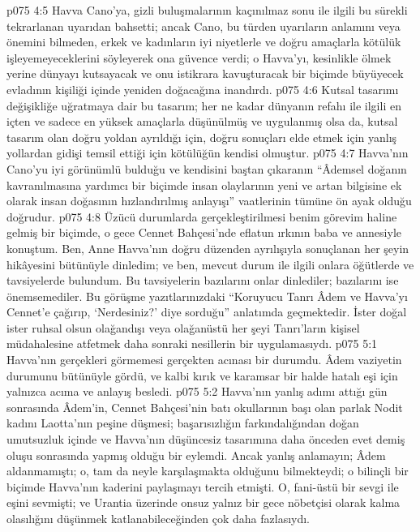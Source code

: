\vs p075 4:5 Havva Cano’ya, gizli buluşmalarının kaçınılmaz sonu ile ilgili bu sürekli tekrarlanan uyarıdan bahsetti; ancak Cano, bu türden uyarıların anlamını veya önemini bilmeden, erkek ve kadınların iyi niyetlerle ve doğru amaçlarla kötülük işleyemeyeceklerini söyleyerek ona güvence verdi; o Havva’yı, kesinlikle ölmek yerine dünyayı kutsayacak ve onu istikrara kavuşturacak bir biçimde büyüyecek evladının kişiliği içinde yeniden doğacağına inandırdı.
\vs p075 4:6 Kutsal tasarımı değişikliğe uğratmaya dair bu tasarım; her ne kadar dünyanın refahı ile ilgili en içten ve sadece en yüksek amaçlarla düşünülmüş ve uygulanmış olsa da, kutsal tasarım olan doğru yoldan ayrıldığı için, doğru sonuçları elde etmek için yanlış yollardan gidişi temsil ettiği için kötülüğün kendisi olmuştur.
\vs p075 4:7 Havva’nın Cano’yu iyi görünümlü bulduğu ve kendisini baştan çıkaranın “Âdemsel doğanın kavranılmasına yardımcı bir biçimde insan olaylarının yeni ve artan bilgisine ek olarak insan doğasının hızlandırılmış anlayışı” vaatlerinin tümüne ön ayak olduğu doğrudur.
\vs p075 4:8 Üzücü durumlarda gerçekleştirilmesi benim görevim haline gelmiş bir biçimde, o gece Cennet Bahçesi’nde eflatun ırkının baba ve annesiyle konuştum. Ben, Anne Havva’nın doğru düzenden ayrılışıyla sonuçlanan her şeyin hikâyesini bütünüyle dinledim; ve ben, mevcut durum ile ilgili onlara öğütlerde ve tavsiyelerde bulundum. Bu tavsiyelerin bazılarını onlar dinlediler; bazılarını ise önemsemediler. Bu görüşme yazıtlarınızdaki “Koruyucu Tanrı Âdem ve Havva’yı Cennet’e çağırıp, ‘Nerdesiniz?’ diye sorduğu” anlatımda geçmektedir. İster doğal ister ruhsal olsun olağandışı veya olağanüstü her şeyi Tanrı’ların kişisel müdahalesine atfetmek daha sonraki nesillerin bir uygulamasıydı.
\vs p075 5:1 Havva’nın gerçekleri görmemesi gerçekten acınası bir durumdu. Âdem vaziyetin durumunu bütünüyle gördü, ve kalbi kırık ve karamsar bir halde hatalı eşi için yalnızca acıma ve anlayış besledi.
\vs p075 5:2 Havva’nın yanlış adımı attığı gün sonrasında Âdem’in, Cennet Bahçesi’nin batı okullarının başı olan parlak Nodit kadını Laotta’nın peşine düşmesi; başarısızlığın farkındalığından doğan umutsuzluk içinde ve Havva’nın düşüncesiz tasarımına daha önceden evet demiş oluşu sonrasında yapmış olduğu bir eylemdi. Ancak yanlış anlamayın; Âdem aldanmamıştı; o, tam da neyle karşılaşmakta olduğunu bilmekteydi; o bilinçli bir biçimde Havva’nın kaderini paylaşmayı tercih etmişti. O, fani\hyp{}üstü bir sevgi ile eşini sevmişti; ve Urantia üzerinde onsuz yalnız bir gece nöbetçisi olarak kalma olasılığını düşünmek katlanabileceğinden çok daha fazlasıydı.
